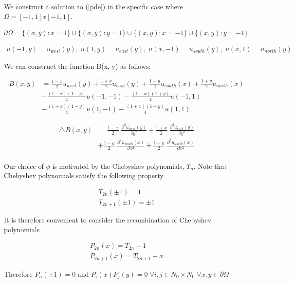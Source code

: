 \documentclass[final]{siamart1116}
\numberwithin{theorem}{section}
\begin{document}
We construct a solution to (\ref{pde}) in the specific case where $\Omega = [-1, 1] x [-1, 1]$. 

$\partial \Omega = \{(x, y): x = 1\} \cup  \{(x, y): y = 1\} \cup  \{(x, y): x = -1\} \cup \{(x, y): y = -1\}$


\begin{align*}
u(-1, y) = u_{west}(y), \; u(1, y) = u_{east}(y),  \; u(x, -1) = u_{south}(y),  \; u(x, 1) = u_{north}(y) 
\end{align*}

We can construct the function B(x, y) as follows:


\begin{align*}
B(x, y) &= \frac{1-x}{2} u_{west}(y) + \frac{1+x}{2} u_{east}(y) + \frac{1-y}{2} u_{south}(x) + \frac{1+y}{2} u_{north}(x) \\ 
		& - \frac{(1-x)(1-y)}{4}u(-1, -1) - \frac{(1-x)(1+y)}{4}u(-1, 1) \\
        & - \frac{(1+x)(1-y)}{4}u(1, -1) - \frac{(1+x)(1+y)}{4}u(1, 1) 
\end{align*}

\begin{align*}
\bigtriangleup B(x, y) &= \frac{1-x}{2} \; \frac{\partial^2 u_{west}(y) }{\partial y^2}+ \frac{1+x}{2} \; \frac{\partial^2 u_{east}(y) }{\partial y^2} \\
& + \frac{1-y}{2} \; \frac{\partial^2 u_{south}(x) }{\partial x^2} + \frac{1+y}{2} \; \frac{\partial^2 u_{north}(x) }{\partial x^2} \\ 
\end{align*}


Our choice of $\phi$ is motivated by the Chebyshev polynomials, $T_n$. Note that Chebyshev polynomials satisfy the following property

\begin{align*}
T_{2n}(\pm 1) = 1 \\
T_{2n+1}(\pm 1) = \pm 1
\end{align*}

It is therefore convenient to consider the recombination of Chebyshev polynomials

\begin{align*}
P_{2n}(x) = T_{2n} - 1 \\
P_{2n+1}(x) =  T_{2n+1} - x 
\end{align*}

Therefore $P_{n}(\pm 1) = 0$ and $P_i (x) P_j(y) = 0 \;  \forall  i, j \in N_0 \times N_0 \; \forall x, y \in \partial \Omega $
\end{document}
